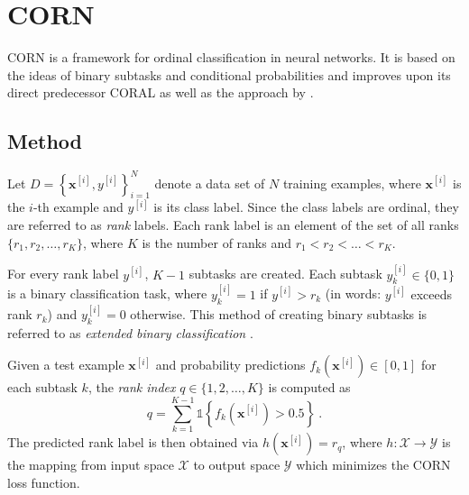 \clearpage %
\section{CORN} \label{sec:ordinal:corn}
\acf{CORN} \cite{corn}
is a framework for ordinal classification in neural networks.
It is based on the ideas of binary subtasks and conditional probabilities
and improves upon
  its direct predecessor \ac{CORAL} \cite{coral}
  as well as the approach by \citeauthor{extended_binary_nn} \cite{extended_binary_nn}.
%
%
%


\subsection{Method} \label{sec:corn:method}
%
Let $D = \left\{ \mathbf{x}^{[i]}, y^{[i]} \right\}_{i=1}^N$ denote a data set of $N$ training examples,
where $\mathbf{x}^{[i]}$ is the $i$-th example and $y^{[i]}$ is its class label.
Since the class labels are ordinal, they are referred to as \emph{rank} labels.
Each rank label is an element of the set of all ranks $\{r_1, r_2, \ldots, r_K\}$,
  where
  $K$ is the number of ranks
  and $r_1 < r_2 < \ldots < r_K$.

For every rank label $y^{[i]}$,
$K - 1$ subtasks are created.
Each subtask $y^{[i]}_k \in \{0, 1\}$ is a binary classification task,
  where
    $y^{[i]}_k = 1$ if $y^{[i]} > r_k$ (in words: {$y^{[i]}$ exceeds rank $r_k$})
    and $y^{[i]}_k = 0$ otherwise.
This method of creating binary subtasks is referred to as \emph{extended binary classification} \cite{extended_binary}.

Given a test example $\mathbf{x}^{[i]}$
and probability predictions $f_k(\mathbf{x}^{[i]}) \in [0,1]$ for each subtask $k$,
the \emph{rank index} $q \in \{1, 2, \ldots, K\}$ is computed as
\begin{equation}
  q = \sum_{k=1}^{K-1} \mathbb{1}\left\{f_k(\mathbf{x}^{[i]}) > 0.5\right\} \ .
\end{equation}
The predicted rank label is then obtained via
$h(\mathbf{x}^{[i]}) = r_q$,
where $h: \mathcal{X} \to \mathcal{Y}$ is the mapping from input space $\mathcal{X}$ to output space $\mathcal{Y}$ %
which minimizes the CORN loss function.


